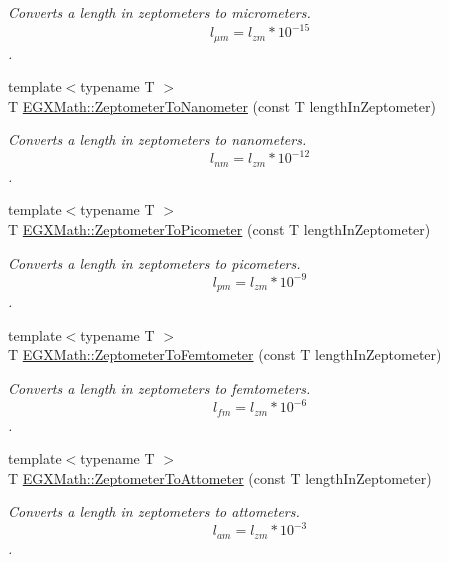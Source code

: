 \begin{DoxyCompactItemize}
\begin{DoxyCompactList}\small\item\em Converts a length in zeptometers to micrometers. \[ l_{\mu m}=l_{zm} * 10^{-15} \]. \end{DoxyCompactList}\item 
{\footnotesize template$<$typename T $>$ }\\T \mbox{\hyperlink{group___e_g_x_math-_conversions-_length_conversions-_s_i-_zeptometer-_s_i_ga0a9d1243a7723cac27aeb6ed48acc3e8}{E\+G\+X\+Math\+::\+Zeptometer\+To\+Nanometer}} (const T length\+In\+Zeptometer)
\begin{DoxyCompactList}\small\item\em Converts a length in zeptometers to nanometers. \[ l_{nm}=l_{zm} * 10^{-12} \]. \end{DoxyCompactList}\item 
{\footnotesize template$<$typename T $>$ }\\T \mbox{\hyperlink{group___e_g_x_math-_conversions-_length_conversions-_s_i-_zeptometer-_s_i_gae7409493227692a85b7fa5016a007de3}{E\+G\+X\+Math\+::\+Zeptometer\+To\+Picometer}} (const T length\+In\+Zeptometer)
\begin{DoxyCompactList}\small\item\em Converts a length in zeptometers to picometers. \[ l_{pm}=l_{zm} * 10^{-9} \]. \end{DoxyCompactList}\item 
{\footnotesize template$<$typename T $>$ }\\T \mbox{\hyperlink{group___e_g_x_math-_conversions-_length_conversions-_s_i-_zeptometer-_s_i_ga8975921335cca63259a2c02edfb39c00}{E\+G\+X\+Math\+::\+Zeptometer\+To\+Femtometer}} (const T length\+In\+Zeptometer)
\begin{DoxyCompactList}\small\item\em Converts a length in zeptometers to femtometers. \[ l_{fm}=l_{zm} * 10^{-6} \]. \end{DoxyCompactList}\item 
{\footnotesize template$<$typename T $>$ }\\T \mbox{\hyperlink{group___e_g_x_math-_conversions-_length_conversions-_s_i-_zeptometer-_s_i_ga390ab639bca5b294d985e94d756368c5}{E\+G\+X\+Math\+::\+Zeptometer\+To\+Attometer}} (const T length\+In\+Zeptometer)
\begin{DoxyCompactList}\small\item\em Converts a length in zeptometers to attometers. \[ l_{am}=l_{zm} * 10^{-3} \]. \end{DoxyCompactList}\item 

\end{DoxyCompactItemize}
